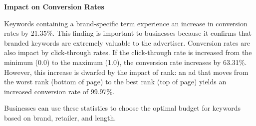 \documentclass[../summaries.tex]{subfiles}
\begin{document}
\textbf{Impact on Conversion Rates}

Keywords containing a brand-specific term experience an increase in conversion rates by 21.35\%. This finding is important to businesses because it confirms that branded keywords are extremely valuable to the advertiser. Conversion rates are also impact by click-through rates. If the click-through rate is increased from the minimum (0.0) to the maximum (1.0), the conversion rate increases by 63.31\%. However, this increase is dwarfed by the impact of rank:  an ad that moves from the worst rank (bottom of page) to the best rank (top of page) yields an increased conversion rate of 99.97\%.

Businesses can use these statistics to choose the optimal budget for keywords based on brand, retailer, and length.
\end{document}

